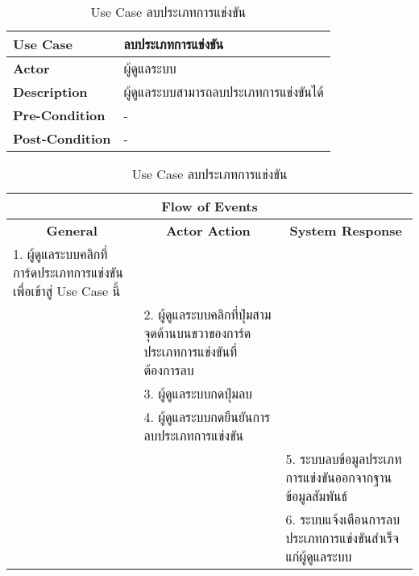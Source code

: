 \begin{table}[H]
    \caption{Use Case ลบประเภทการแข่งขัน}
    \label{tab:usecase-remove-contest}
    \begin{tabularx}{\textwidth}{ | p{3cm} | X | }
    \hline
    \textbf{Use Case} & ลบประเภทการแข่งขัน \\
    \hline
    \textbf{Actor} & ผู้ดูแลระบบ \\
    \hline
    \textbf{Description} & ผู้ดูแลระบบสามารถลบประเภทการแข่งขันได้ \\
    \hline
    \textbf{Pre-Condition} & - \\
    \hline
    \textbf{Post-Condition} & - \\
    \hline
    \end{tabularx}
    \begin{tabularx}{\textwidth}{ | X | X | X | }
    \multicolumn{3}{|c|}{\textbf{Flow of Events}} \\
    \hline
    \multicolumn{1}{|c|}{\textbf{General}} & \multicolumn{1}{|c|}{\textbf{Actor Action}} & \multicolumn{1}{|c|}{\textbf{System Response}} \\
    \hline
    1. ผู้ดูแลระบบคลิกที่การ์ดประเภทการแข่งขันเพื่อเข้าสู่ Use Case นี้ &  &  \\
    \hline
    & 2. ผู้ดูแลระบบคลิกที่ปุ่มสามจุดด้านบนขวาของการ์ดประเภทการแข่งขันที่ต้องการลบ &  \\
    \hline
    & 3. ผู้ดูแลระบบกดปุ่มลบ  &  \\
    \hline
    & 4. ผู้ดูแลระบบกดยืนยันการลบประเภทการแข่งขัน &  \\
    \hline
    & & 5. ระบบลบข้อมูลประเภทการแข่งขันออกจากฐานข้อมูลสัมพันธ์ \\
    \hline
    & & 6. ระบบแจ้งเตือนการลบประเภทการแข่งขันสำเร็จแก่ผู้ดูแลระบบ \\
    \hline
    \end{tabularx}
\end{table}
